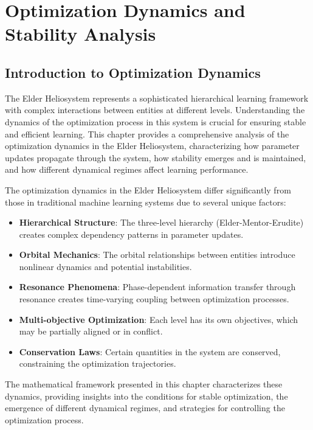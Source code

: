 \chapter{Optimization Dynamics and Stability Analysis}

\section{Introduction to Optimization Dynamics}

The Elder Heliosystem represents a sophisticated hierarchical learning framework with complex interactions between entities at different levels. Understanding the dynamics of the optimization process in this system is crucial for ensuring stable and efficient learning. This chapter provides a comprehensive analysis of the optimization dynamics in the Elder Heliosystem, characterizing how parameter updates propagate through the system, how stability emerges and is maintained, and how different dynamical regimes affect learning performance.

The optimization dynamics in the Elder Heliosystem differ significantly from those in traditional machine learning systems due to several unique factors:

\begin{itemize}
    \item \textbf{Hierarchical Structure}: The three-level hierarchy (Elder-Mentor-Erudite) creates complex dependency patterns in parameter updates.
    \item \textbf{Orbital Mechanics}: The orbital relationships between entities introduce nonlinear dynamics and potential instabilities.
    \item \textbf{Resonance Phenomena}: Phase-dependent information transfer through resonance creates time-varying coupling between optimization processes.
    \item \textbf{Multi-objective Optimization}: Each level has its own objectives, which may be partially aligned or in conflict.
    \item \textbf{Conservation Laws}: Certain quantities in the system are conserved, constraining the optimization trajectories.
\end{itemize}

The mathematical framework presented in this chapter characterizes these dynamics, providing insights into the conditions for stable optimization, the emergence of different dynamical regimes, and strategies for controlling the optimization process.

